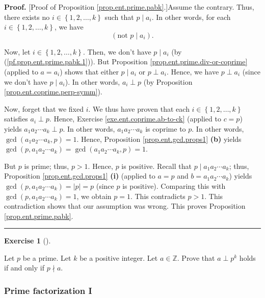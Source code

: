 \documentclass[numbers=enddot,12pt,final,onecolumn,notitlepage]{scrartcl}%
\newcounter{exer}
\numberwithin{exer}{subsection}
\theoremstyle{definition}
\newtheorem{exmp}[exer]{Exercise}
\newenvironment{exercise}[1][]
{\begin{exmp}[#1]\begin{leftbar}}
{\end{leftbar}\end{exmp}}
\newenvironment{fineprint}{\begin{small}}{\end{small}}
\newenvironment{proof}[1][Proof]{\noindent\textbf{#1.} }{\ \rule{0.5em}{0.5em}}
\begin{document}
\begin{fineprint}
\begin{proof}
[Proof of Proposition \ref{prop.ent.prime.pabk}.]Assume the contrary. Thus,
there exists no $i\in\left\{  1,2,\ldots,k\right\}  $ such that $p\mid a_{i}$.
In other words, for each $i\in\left\{  1,2,\ldots,k\right\}  $, we have%
\begin{equation}
\left(  \text{not }p\mid a_{i}\right)  . \label{pf.prop.ent.prime.pabk.1}%
\end{equation}


Now, let $i\in\left\{  1,2,\ldots,k\right\}  $. Then, we don't have $p\mid
a_{i}$ (by (\ref{pf.prop.ent.prime.pabk.1})). But Proposition
\ref{prop.ent.prime.div-or-coprime} (applied to $a=a_{i}$) shows that either
$p\mid a_{i}$ or $p\perp a_{i}$. Hence, we have $p\perp a_{i}$ (since we don't
have $p\mid a_{i}$). In other words, $a_{i}\perp p$ (by Proposition
\ref{prop.ent.coprime.perp-symm}).

Now, forget that we fixed $i$. We thus have proven that each $i\in\left\{
1,2,\ldots,k\right\}  $ satisfies $a_{i}\perp p$. Hence, Exercise
\ref{exe.ent.coprime.ab-to-ck} (applied to $c=p$) yields $a_{1}a_{2}\cdots
a_{k}\perp p$. In other words, $a_{1}a_{2}\cdots a_{k}$ is coprime to $p$. In
other words, $\gcd\left(  a_{1}a_{2}\cdots a_{k},p\right)  =1$. Hence,
Proposition \ref{prop.ent.gcd.props1} \textbf{(b)} yields $\gcd\left(
p,a_{1}a_{2}\cdots a_{k}\right)  =\gcd\left(  a_{1}a_{2}\cdots a_{k},p\right)
=1$.

But $p$ is prime; thus, $p>1$. Hence, $p$ is positive. Recall that $p\mid
a_{1}a_{2}\cdots a_{k}$; thus, Proposition \ref{prop.ent.gcd.props1}
\textbf{(i)} (applied to $a=p$ and $b=a_{1}a_{2}\cdots a_{k}$) yields
$\gcd\left(  p,a_{1}a_{2}\cdots a_{k}\right)  =\left\vert p\right\vert =p$
(since $p$ is positive). Comparing this with $\gcd\left(  p,a_{1}a_{2}\cdots
a_{k}\right)  =1$, we obtain $p=1$. This contradicts $p>1$. This contradiction
shows that our assumption was wrong. This proves Proposition
\ref{prop.ent.prime.pabk}.
\end{proof}
\end{fineprint}

\begin{exercise}
\label{exe.ent.prime.coprime-to-pk}Let $p$ be a prime. Let $k$ be a positive
integer. Let $a\in\mathbb{Z}$. Prove that $a\perp p^{k}$ holds if and only if
$p\nmid a$.
\end{exercise}

\subsubsection{Prime factorization I}
\end{document}
